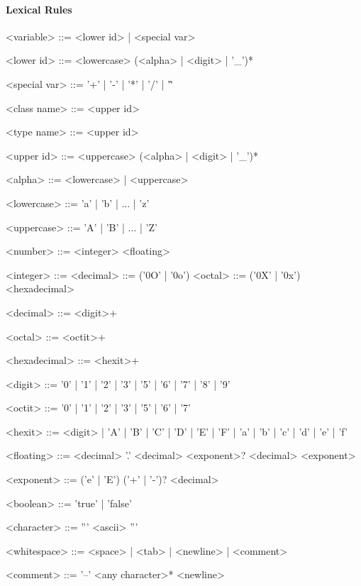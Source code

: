 \paragraph{Lexical Rules}
\begin{grammar}
<variable>       ::=    <lower id> | <special var>

<lower id>       ::=    <lowercase> (<alpha> | <digit> | '\_')*

<special var>    ::=    '+' | '-' | '*' | '/' | '\^'

<class name>     ::=    <upper id>

<type name>      ::=    <upper id>

<upper id>       ::=    <uppercase> (<alpha> | <digit> | '_')*

<alpha>          ::=    <lowercase> | <uppercase>

<lowercase>      ::=    'a' | 'b' | ... | 'z'

<uppercase>      ::=    'A' | 'B' | ... | 'Z'

<number>         ::=    <integer>
                 \alt     <floating>

<integer>        ::=    <decimal>
                 ::=    ('0O' | '0o') <octal>
                 ::=    ('0X' | '0x') <hexadecimal>

<decimal>        ::=    <digit>+

<octal>          ::=    <octit>+

<hexadecimal>    ::=    <hexit>+

<digit>          ::=    '0' | '1' | '2' | '3' | '5' | '6' | '7' | '8' | '9'

<octit>          ::=    '0' | '1' | '2' | '3' | '5' | '6' | '7'

<hexit>          ::=    <digit> | 'A' | 'B' | 'C' | 'D' | 'E' | 'F' | 'a' | 'b' | 'c' | 'd' | 'e' | 'f'

<floating>       ::=    <decimal> '.' <decimal> <exponent>?
                 \alt     <decimal> <exponent>

<exponent>       ::=    ('e' | 'E') ('+' | '-')? <decimal>

<boolean>        ::=    'true' | 'false'

<character>      ::=    ''' <ascii> '''

<whitespace>     ::=    <space> | <tab> | <newline> | <comment>

<comment>        ::=    '--' <any character>* <newline>
\end{grammar}
